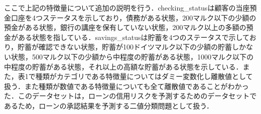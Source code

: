 ここで上記の特徴量について追加の説明を行う．checking\_statusは顧客の当座預金口座を4つステータスを示しており，債務がある状態，200マルク以下の少額の預金がある状態，銀行の講座を保有していない状態，200マルク以上の多額の預金がある状態を指している．savings\_statusは貯蓄を4つのステータスで示しており，貯蓄が確認できない状態，貯蓄が100ドイツマルク以下の少額の貯蓄しかない状態，500マルク以下の少額から中程度の貯蓄がある状態，1000マルク以下の中程度の貯蓄がある状態，それ以上の高額な貯蓄がある状態を示している．また，表1で種類がカテゴリである特徴量についてはダミー変数化し離散値として扱う．また種類が数値である特徴量についても全て離散値であることがわかった．このデータセットは，ローンの信用リスクを予測するためのデータセットであるため，ローンの承認結果を予測する二値分類問題として扱う．